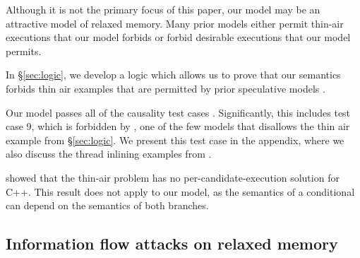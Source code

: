 Although it is not the primary focus of this paper, our model may be an
attractive model of relaxed memory.  Many prior models either permit
thin-air executions that our model forbids or forbid desirable executions
that our model permits.

In \S\ref{sec:logic}, we develop a logic which allows us to prove that our
semantics forbids thin air examples that are permitted by prior speculative
models
\cite{Manson:2005:JMM:1047659.1040336,DBLP:conf/esop/JagadeesanPR10,DBLP:conf/popl/KangHLVD17}.

Our model passes all of the causality test cases
\cite{PughWebsite}.  Significantly, this
includes test case 9, which is forbidden by \cite{DBLP:conf/lics/JeffreyR16},
one of the few models that disallows the thin air example from
\S\ref{sec:logic}.  We present this test case in the appendix, where we also
discuss the thread inlining examples from
\cite{Manson:2005:JMM:1047659.1040336}.

\citet{DBLP:conf/esop/BattyMNPS15} showed that the thin-air problem has
no per-candidate-execution solution for C++.  This result does not apply to
our model, as the semantics of a conditional can depend on the semantics
of both branches.

\subsection{Information flow attacks on relaxed memory}
\label{sec:info-flow-attack}


